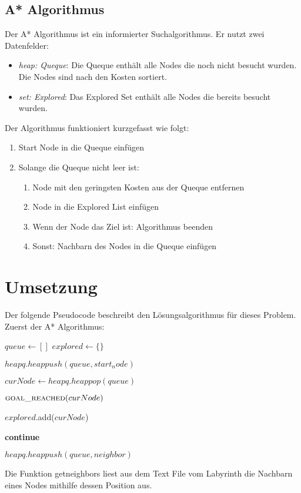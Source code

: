 \documentclass[a4paper,10pt,ngerman]{scrartcl}
\begin{document}
\subsection{A* Algorithmus}
\label{A* Algorithmus}\label{sec:astar}
Der A* Algorithmus ist ein informierter Suchalgorithmus. Er nutzt zwei Datenfelder:
\begin{itemize}
  \item \emph{heap: Queque}: Die Queque enthält alle Nodes die noch nicht besucht wurden. Die Nodes sind nach den Kosten sortiert.
  \item \emph{set: Explored}: Das Explored Set enthält alle Nodes die bereits besucht wurden.
\end{itemize}
Der Algorithmus funktioniert kurzgefasst wie folgt:
\begin{enumerate}
  \item Start Node in die Queque einfügen
  \item Solange die Queque nicht leer ist:
  \begin{enumerate}
    \item Node mit den geringsten Kosten aus der Queque entfernen
    \item Node in die Explored List einfügen
    \item Wenn der Node das Ziel ist: Algorithmus beenden
    \item Sonst: Nachbarn des Nodes in die Queque einfügen
  \end{enumerate}
\end{enumerate}


\clearpage
\section{Umsetzung}\label{sec:umsetzung}
Der folgende Pseudocode beschreibt den Lösungsalgorithmus für dieses Problem.\\
Zuerst der A* Algorithmus:
\begin{algorithmic}
\State $queue \gets []$
\State $explored \gets \{\}$

\State $heapq.heappush(queue, start_node)$

    \State $curNode \gets heapq.heappop(queue)$

        \State $\Call{goal\_reached}{curNode}$

    \EndIf

    \State $explored$.add($curNode$)

            \State \textbf{continue}
        \EndIf

            \State $heapq.heappush(queue, neighbor)$
        \EndIf
    \EndFor
\EndWhile
\end{algorithmic}
Die Funktion get\textunderscore neighbors liest aus dem Text File vom Labyrinth die Nachbarn eines Nodes mithilfe dessen Position aus.\\
\end{document}
